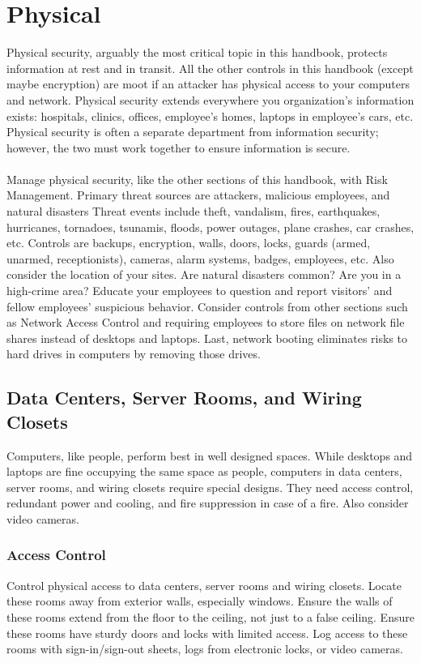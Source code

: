 \section{Physical}\label{sec:"Physical"}
Physical security, arguably the most critical topic in this handbook, protects  information at rest and in transit. All the other controls in this handbook (except maybe encryption) are moot if an attacker has physical access to your computers and network. Physical security extends everywhere you organization's information exists: hospitals, clinics, offices, employee's homes, laptops in employee's cars, etc. Physical security is often a separate department from information security; however, the two must work together to ensure information is secure. \\\\
Manage physical security, like the other sections of this handbook, with Risk Management. Primary threat sources are attackers, malicious employees, and natural disasters Threat events include theft, vandalism, fires, earthquakes, hurricanes, tornadoes, tsunamis, floods, power outages, plane crashes, car crashes, etc. Controls are backups, encryption, walls, doors, locks, guards (armed, unarmed, receptionists), cameras, alarm systems, badges, employees, etc. Also consider the location of your sites. Are natural disasters common? Are you in a high-crime area? Educate your employees to question and report visitors' and fellow employees' suspicious behavior. Consider controls from other sections such as Network Access Control and requiring employees to store files on network file shares instead of desktops and laptops. Last, network booting eliminates risks to hard drives in computers by removing those drives.
\subsection{Data Centers, Server Rooms, and Wiring Closets}
Computers, like people, perform best in well designed spaces. While desktops and laptops are fine occupying the same space as people, computers in data centers, server rooms, and wiring closets require special designs. They need access control, redundant power and cooling, and fire suppression in case of a fire. Also consider video cameras.
\subsubsection{Access Control}
Control physical access to data centers, server rooms and wiring closets. Locate these rooms away from exterior walls, especially windows. Ensure the walls of these rooms extend from the floor to the ceiling, not just to a false ceiling. Ensure these rooms have sturdy doors and locks with limited access. Log access to these rooms with sign-in/sign-out sheets, logs from electronic locks, or video cameras.

